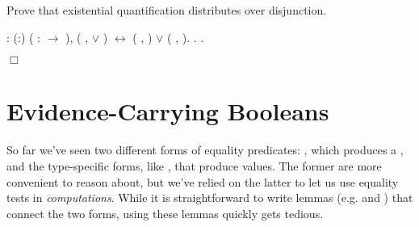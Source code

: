 \documentclass[12pt]{report}
\begin{document}
 Prove that existential quantification distributes over
    disjunction. \begin{coqdoccode}
\coqdocemptyline
\coqdocnoindent
{}  : \coqdockw{\ensuremath{\forall}} (:) (  :  \ensuremath{\rightarrow} ),\coqdoceol
\coqdocindent{1.00em}
(\coqdoctac{\ensuremath{\exists}} ,   \ensuremath{\lor}  ) \ensuremath{\leftrightarrow} (\coqdoctac{\ensuremath{\exists}} ,  ) \ensuremath{\lor} (\coqdoctac{\ensuremath{\exists}} ,  ).\coqdoceol
\coqdocnoindent
{}.\coqdoceol
 .\coqdoceol
\end{coqdoccode}
\ensuremath{\Box} \begin{coqdoccode}
\coqdocemptyline
\end{coqdoccode}
\section{Evidence-Carrying Booleans}



 So far we've seen two different forms of equality predicates:
    , which produces a , and the type-specific forms, like
    , that produce  values.  The former are more
    convenient to reason about, but we've relied on the latter to let
    us use equality tests in \textit{computations}.  While it is
    straightforward to write lemmas (e.g.  and
    ) that connect the two forms, using these lemmas
    quickly gets tedious. 

\subsubsection{ }
\end{document}
